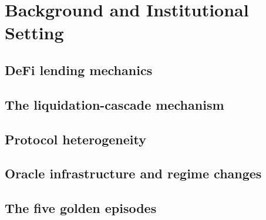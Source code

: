 \section{Background and Institutional Setting}\label{sec:background}

\subsection{DeFi lending mechanics}\label{sec:bg-mechanics}

\subsection{The liquidation-cascade mechanism}\label{sec:bg-cascade}

\subsection{Protocol heterogeneity}\label{sec:bg-protocols}

\subsection{Oracle infrastructure and regime changes}\label{sec:bg-oracles}

\subsection{The five golden episodes}\label{sec:bg-episodes}
